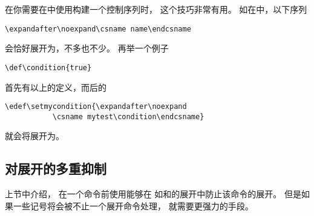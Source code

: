 \documentclass{book}
\begin{document}
在你需要在中使用构建一个控制序列时，
这个技巧非常有用。
如在中，以下序列
\begin{verbatim}
\expandafter\noexpand\csname name\endcsname
\end{verbatim}
会恰好展开为，不多也不少。
再举一个例子
\begin{verbatim}
\def\condition{true}
\end{verbatim}
首先有以上的定义，而后的
\begin{verbatim}
\edef\setmycondition{\expandafter\noexpand
           \csname mytest\condition\endcsname}
\end{verbatim}
就会将展开为。

\subsection{对展开的多重抑制}

上节中介绍，
在一个命令前使用能够在
如和的展开中防止该命令的展开。
但是如果一些记号将会被不止一个展开命令处理，
就需要更强力的手段。
\end{document}
